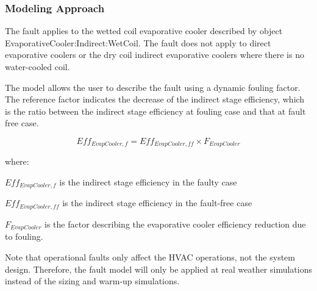 \subsubsection{Modeling Approach}

The fault applies to the wetted coil evaporative cooler described by object EvaporativeCooler:Indirect:WetCoil. The fault does not apply to direct evaporative coolers or the dry coil indirect evaporative coolers where there is no water-cooled coil.

The model allows the user to describe the fault using a dynamic fouling factor. The reference factor indicates the decrease of the indirect stage efficiency, which is the ratio between the indirect stage efficiency at fouling case and that at fault free case.

\begin{equation}
Eff_{EvapCooler,f} = Eff_{EvapCooler,ff} \times F_{EvapCooler}
\end{equation}

where:

\(Eff_{EvapCooler,f}\) is the indirect stage efficiency in the faulty case

\(Eff_{EvapCooler,ff}\) is the indirect stage efficiency in the fault-free case

\(F_{EvapCooler}\) is the factor describing the evaporative cooler efficiency reduction due to fouling.

Note that operational faults only affect the HVAC operations, not the system design. Therefore, the fault model will only be applied at real weather simulations instead of the sizing and warm-up simulations.
